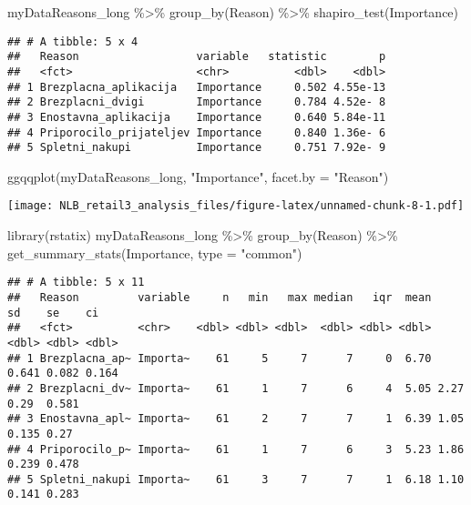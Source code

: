 \documentclass[
]{article}
\newenvironment{Shaded}{\begin{snugshade}}{\end{snugshade}}
\newcommand{\AttributeTok}[1]{\textcolor[rgb]{0.77,0.63,0.00}{#1}}
\newcommand{\FunctionTok}[1]{\textcolor[rgb]{0.00,0.00,0.00}{#1}}
\newcommand{\NormalTok}[1]{#1}
\newcommand{\SpecialCharTok}[1]{\textcolor[rgb]{0.00,0.00,0.00}{#1}}
\newcommand{\StringTok}[1]{\textcolor[rgb]{0.31,0.60,0.02}{#1}}
\begin{document}
\begin{Shaded}
\begin{Highlighting}[]
\NormalTok{myDataReasons\_long }\SpecialCharTok{\%\textgreater{}\%}
  \FunctionTok{group\_by}\NormalTok{(Reason) }\SpecialCharTok{\%\textgreater{}\%}
  \FunctionTok{shapiro\_test}\NormalTok{(Importance)}
\end{Highlighting}
\end{Shaded}

\begin{verbatim}
## # A tibble: 5 x 4
##   Reason                  variable   statistic        p
##   <fct>                   <chr>          <dbl>    <dbl>
## 1 Brezplacna_aplikacija   Importance     0.502 4.55e-13
## 2 Brezplacni_dvigi        Importance     0.784 4.52e- 8
## 3 Enostavna_aplikacija    Importance     0.640 5.84e-11
## 4 Priporocilo_prijateljev Importance     0.840 1.36e- 6
## 5 Spletni_nakupi          Importance     0.751 7.92e- 9
\end{verbatim}

\begin{Shaded}
\begin{Highlighting}[]
\FunctionTok{ggqqplot}\NormalTok{(myDataReasons\_long, }\StringTok{"Importance"}\NormalTok{, }\AttributeTok{facet.by =} \StringTok{"Reason"}\NormalTok{)}
\end{Highlighting}
\end{Shaded}

\texttt{[image: NLB\_retail3\_analysis\_files/figure-latex/unnamed-chunk-8-1.pdf]}

\begin{Shaded}
\begin{Highlighting}[]
\FunctionTok{library}\NormalTok{(rstatix)}
\NormalTok{myDataReasons\_long }\SpecialCharTok{\%\textgreater{}\%}
  \FunctionTok{group\_by}\NormalTok{(Reason) }\SpecialCharTok{\%\textgreater{}\%}
  \FunctionTok{get\_summary\_stats}\NormalTok{(Importance, }\AttributeTok{type =} \StringTok{"common"}\NormalTok{)}
\end{Highlighting}
\end{Shaded}

\begin{verbatim}
## # A tibble: 5 x 11
##   Reason         variable     n   min   max median   iqr  mean    sd    se    ci
##   <fct>          <chr>    <dbl> <dbl> <dbl>  <dbl> <dbl> <dbl> <dbl> <dbl> <dbl>
## 1 Brezplacna_ap~ Importa~    61     5     7      7     0  6.70 0.641 0.082 0.164
## 2 Brezplacni_dv~ Importa~    61     1     7      6     4  5.05 2.27  0.29  0.581
## 3 Enostavna_apl~ Importa~    61     2     7      7     1  6.39 1.05  0.135 0.27 
## 4 Priporocilo_p~ Importa~    61     1     7      6     3  5.23 1.86  0.239 0.478
## 5 Spletni_nakupi Importa~    61     3     7      7     1  6.18 1.10  0.141 0.283
\end{verbatim}
\end{document}

